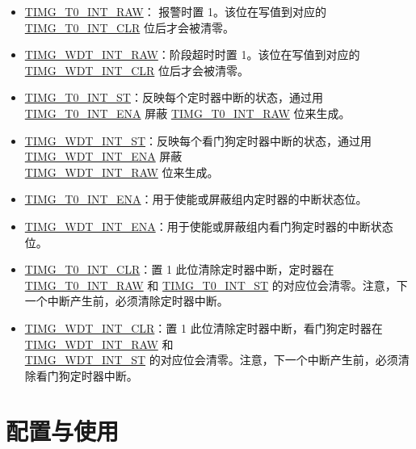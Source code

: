 \documentclass[main\_\_CN.tex]{subfiles}
\begin{document}
\begin{itemize}

\item \hyperref[fielddesc:TIMGT0INTRAW]{TIMG\_T0\_INT\_RAW}：
报警时置 1。该位在写值到对应的 \hyperref[fielddesc:TIMGT0INTCLR]{TIMG\_T0\_INT\_CLR} 位后才会被清零。
\item \hyperref[fielddesc:TIMGWDTINTRAW]{TIMG\_WDT\_INT\_RAW}：阶段超时时置 1。该位在写值到对应的 \hyperref[fielddesc:TIMGWDTINTCLR]{TIMG\_WDT\_INT\_CLR} 位后才会被清零。
\item \hyperref[fielddesc:TIMGT0INTST]{TIMG\_T0\_INT\_ST}：反映每个定时器中断的状态，通过用 \hyperref[fielddesc:TIMGT0INTENA]{TIMG\_T0\_INT\_ENA} 屏蔽 \hyperref[fielddesc:TIMGT0INTRAW]{TIMG\_T0\_INT\_RAW} 位来生成。
\item \hyperref[fielddesc:TIMGWDTINTST]{TIMG\_WDT\_INT\_ST}：反映每个看门狗定时器中断的状态，通过用 \hyperref[fielddesc:TIMGWDTINTENA]{TIMG\_WDT\_INT\_ENA} 屏蔽 \\\hyperref[fielddesc:TIMGWDTINTRAW]{TIMG\_WDT\_INT\_RAW} 位来生成。
\item \hyperref[fielddesc:TIMGT0INTENA]{TIMG\_T0\_INT\_ENA}：用于使能或屏蔽组内定时器的中断状态位。
\item \hyperref[fielddesc:TIMGWDTINTENA]{TIMG\_WDT\_INT\_ENA}：用于使能或屏蔽组内看门狗定时器的中断状态位。
\item \hyperref[fielddesc:TIMGT0INTCLR]{TIMG\_T0\_INT\_CLR}：置 1 此位清除定时器中断，定时器在 \hyperref[fielddesc:TIMGT0INTRAW]{TIMG\_T0\_INT\_RAW} 和 \hyperref[fielddesc:TIMGT0INTST]{TIMG\_T0\_INT\_ST} 的对应位会清零。注意，下一个中断产生前，必须清除定时器中断。
\item \hyperref[fielddesc:TIMGWDTINTCLR]{TIMG\_WDT\_INT\_CLR}：置 1 此位清除定时器中断，看门狗定时器在 \hyperref[fielddesc:TIMGWDTINTRAW]{TIMG\_WDT\_INT\_RAW} 和\\\hyperref[fielddesc:TIMGWDTINTST]{TIMG\_WDT\_INT\_ST} 的对应位会清零。注意，下一个中断产生前，必须清除看门狗定时器中断。
\end{itemize}

\section{配置与使用}
\end{document}
